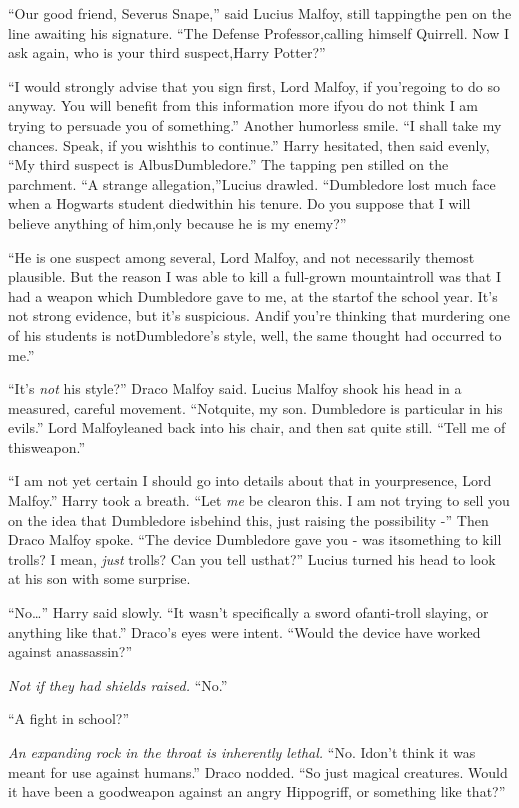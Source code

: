 ``Our good friend, Severus Snape,'' said Lucius Malfoy, still tappingthe pen on the line awaiting his signature. ``The Defense Professor,calling himself Quirrell. Now I ask again, who is your third suspect,Harry Potter?''

``I would strongly advise that you sign first, Lord Malfoy, if you'regoing to do so anyway. You will benefit from this information more ifyou do not think I am trying to persuade you of something.''
Another humorless smile. ``I shall take my chances. Speak, if you wishthis to continue.''
Harry hesitated, then said evenly, ``My third suspect is AlbusDumbledore.''
The tapping pen stilled on the parchment. ``A strange allegation,''Lucius drawled. ``Dumbledore lost much face when a Hogwarts student diedwithin his tenure. Do you suppose that I will believe anything of him,only because he is my enemy?''

``He is one suspect among several, Lord Malfoy, and not necessarily themost plausible. But the reason I was able to kill a full-grown mountaintroll was that I had a weapon which Dumbledore gave to me, at the startof the school year. It's not strong evidence, but it's suspicious. Andif you're thinking that murdering one of his students is notDumbledore's style, well, the same thought had occurred to me.''

``It's \emph{not} his style?'' Draco Malfoy said.
Lucius Malfoy shook his head in a measured, careful movement. ``Notquite, my son. Dumbledore is particular in his evils.'' Lord Malfoyleaned back into his chair, and then sat quite still. ``Tell me of thisweapon.''

``I am not yet certain I should go into details about that in yourpresence, Lord Malfoy.'' Harry took a breath. ``Let \emph{me} be clearon this. I am not trying to sell you on the idea that Dumbledore isbehind this, just raising the possibility -''
Then Draco Malfoy spoke. ``The device Dumbledore gave you - was itsomething to kill trolls? I mean, \emph{just} trolls? Can you tell usthat?''
Lucius turned his head to look at his son with some surprise.

``No\ldots{}'' Harry said slowly. ``It wasn't specifically a sword ofanti-troll slaying, or anything like that.''
Draco's eyes were intent. ``Would the device have worked against anassassin?''

\emph{Not if they had shields raised.} ``No.''

``A fight in school?''

\emph{An expanding rock in the throat is inherently lethal.} ``No. Idon't think it was meant for use against humans.'' Draco nodded. ``So just magical creatures. Would it have been a goodweapon against an angry Hippogriff, or something like that?''

